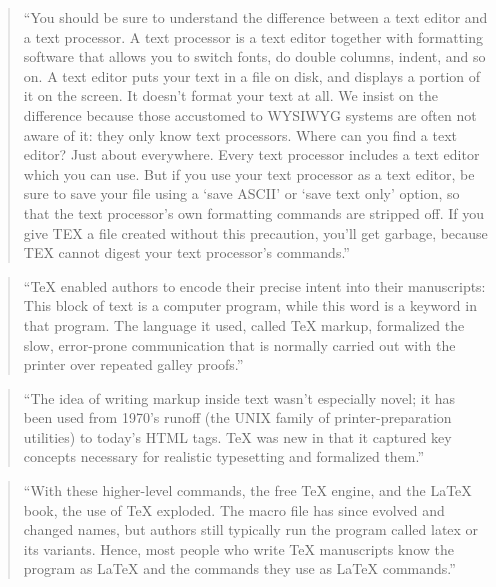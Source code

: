 \documentclass[]{tufte-book}
\begin{document}
\begin{quote}
``You should be sure to understand the difference between a text editor and a text
processor. A text processor is a text editor together with formatting software that
allows you to switch fonts, do double columns, indent, and so on. A text editor
puts your text in a file on disk, and displays a portion of it on the screen. It doesn't
format your text at all. We insist on the difference because those accustomed to WYSIWYG systems are
often not aware of it: they only know text processors. Where can you find a text
editor? Just about everywhere. Every text processor includes a text editor which
you can use. But if you use your text processor as a text editor, be sure to save your
file using a `save ASCII' or `save text only' option, so that the text processor's own
formatting commands are stripped off. If you give TEX a file created without this
precaution, you'll get garbage, because TEX cannot digest your text processor's
commands.'' \citep{seroul2012beginner}
\end{quote}

\begin{quote}
``TeX enabled authors to encode their precise intent into their manuscripts:
This block of text is a computer program, while this word is a keyword in that
program. The language it used, called TeX markup, formalized the slow,
error-prone communication that is normally carried out with the printer over
repeated galley proofs.'' \citep{apte2019lingua}
\end{quote}

\begin{quote}
``The idea of writing markup inside text wasn't especially novel; it has been
used from 1970's runoff (the UNIX family of printer-preparation utilities) to
today's HTML tags. TeX was new in that it captured key concepts necessary for
realistic typesetting and formalized them.'' \citep{apte2019lingua}
\end{quote}

\begin{quote}
``With these higher-level commands, the free TeX engine, and the LaTeX book,
the use of TeX exploded. The macro file has since evolved and changed names, but
authors still typically run the program called latex or its variants. Hence,
most people who write TeX manuscripts know the program as LaTeX and the commands
they use as LaTeX commands.'' \citep{apte2019lingua}
\end{quote}
\end{document}
